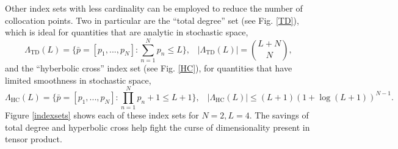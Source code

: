 \documentclass[11pt]{article}
\begin{document}
Other index sets with less cardinality can be employed to reduce the number of collocation points.  Two in particular are the ``total degree'' set (see Fig. \ref{TD}), which is ideal for quantities that are analytic in stochastic space,
\begin{equation}
\Lambda_\text{TD}(L)=\Big\{\bar p=[p_1,...,p_N]:\sum_{n=1}^N p_n \leq L \Big\},\hspace{10pt}|\Lambda_\text{TD}(L)|={L+N\choose N},
\end{equation}
and the ``hyberbolic cross'' index set (see Fig. \ref{HC}), for quantities that have limited smoothness in stochastic space,
\begin{equation}
\Lambda_\text{HC}(L)=\Big\{\bar p=[p_1,...,p_N]:\prod_{n=1}^N p_n+1 \leq L+1 \Big\},\hspace{10pt}|\Lambda_\text{HC}(L)|\leq (L+1)(1+\log(L+1))^{N-1}.
\end{equation}
Figure \ref{indexsets} shows each of these index sets for $N=2,L=4$.  The savings of total degree and hyperbolic cross help fight the curse of dimensionality present in tensor product. 
\end{document}
